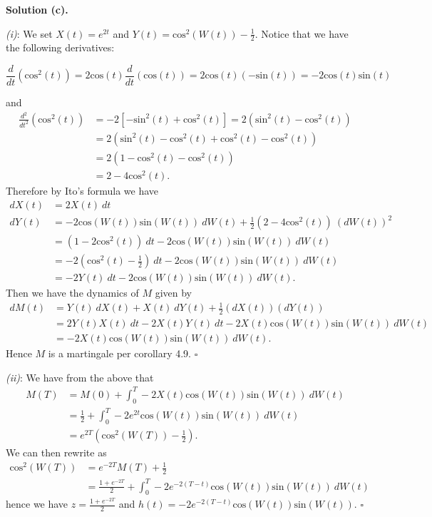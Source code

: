 \documentclass[a4paper,12pt,openany]{book}
\begin{document}
\textbf{Solution (c).}

\emph{(i)}: We set \(X(t)=e^{2t}\) and \(Y(t)=\text{cos}^2(W(t))-\frac{1}{2}\). Notice that we have the following derivatives:

\[
\frac{d}{dt}(\text{cos}^2(t))=2\text{cos}(t)\frac{d}{dt}(\text{cos}(t))=2\text{cos}(t)(-\text{sin}(t))=-2\text{cos}(t)\text{sin}(t)
\]

and
\begin{align*}
\frac{d^2}{dt^2}(\text{cos}^2(t))&=-2\left[-\text{sin}^2(t)+\text{cos}^2(t)\right]=2(\text{sin}^2(t)-\text{cos}^2(t))\\
&=2(\text{sin}^2(t)-\text{cos}^2(t)+\text{cos}^2(t)-\text{cos}^2(t))\\
&=2(1-\text{cos}^2(t)-\text{cos}^2(t))\\
&=2-4\text{cos}^2(t).
\end{align*}
Therefore by Ito's formula we have
\begin{align*}
dX(t)&=2X(t)\ dt\\
dY(t)&=-2\text{cos}(W(t))\text{sin}(W(t))\ dW(t)+\frac{1}{2}(2-4\text{cos}^2(t))\ (dW(t))^2\\
&=(1-2\text{cos}^2(t))\ dt-2\text{cos}(W(t))\text{sin}(W(t))\ dW(t)\\
&=-2\left(\text{cos}^2(t)-\frac{1}{2}\right)\ dt-2\text{cos}(W(t))\text{sin}(W(t))\ dW(t)\\
&=-2Y(t)\ dt-2\text{cos}(W(t))\text{sin}(W(t))\ dW(t).
\end{align*}
Then we have the dynamics of \(M\) given by
\begin{align*}
dM(t)&=Y(t)\ dX(t)+X(t)\ dY(t)+\frac{1}{2}(dX(t))(dY(t))\\
&=2Y(t)X(t)\ dt-2X(t)Y(t)\ dt-2X(t)\text{cos}(W(t))\text{sin}(W(t))\ dW(t)\\
&=-2X(t)\text{cos}(W(t))\text{sin}(W(t))\ dW(t).
\end{align*}
Hence \(M\) is a martingale per corollary 4.9. \(\square\)

\emph{(ii)}: We have from the above that
\begin{align*}
M(T)&=M(0)+\int_0^T-2X(t)\text{cos}(W(t))\text{sin}(W(t))\ dW(t)\\
&=\frac{1}{2}+\int_0^T-2e^{2t}\text{cos}(W(t))\text{sin}(W(t))\ dW(t)\\
&=e^{2T}\left(\text{cos}^2(W(T))-\frac{1}{2}\right).
\end{align*}
We can then rewrite as
\begin{align*}
\text{cos}^2(W(T))&=e^{-2T}M(T)+\frac{1}{2}\\
&=\frac{1+e^{-2T}}{2}+\int_0^T-2e^{-2(T-t)}\text{cos}(W(t))\text{sin}(W(t))\ dW(t)
\end{align*}
hence we have \(z=\frac{1+e^{-2T}}{2}\) and \(h(t)=-2e^{-2(T-t)}\text{cos}(W(t))\text{sin}(W(t))\). \(\square\)
\end{document}
